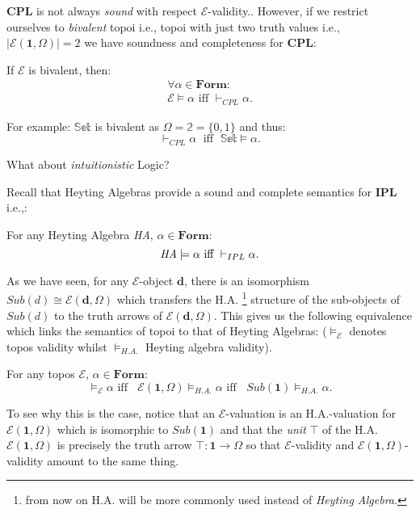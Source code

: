 \textbf{CPL} is not always \emph{sound} with respect $\mathcal{E}$-validity.. \newline
However, if we restrict ourselves to \emph{bivalent} topoi i.e., topoi with just two truth values i.e., $|\mathcal{E}(\textbf{1}, \Omega)|=2$ we have soundness and completeness for \textbf{CPL}:
\begin{prop}\label{bivalence}
	If $\mathcal{E}$ is bivalent, then:
	\begin{gather*}
		\forall \alpha \in \textbf{Form}:\\ 
		\mathcal{E} \models \alpha \text{ iff } \vdash_{CPL} \alpha.
	\end{gather*}
	
	For example:\newline
	$\mathbb{Set}$ is bivalent as $\Omega = \mathbb{2} = \{0,1\}$ and thus:
	\begin{equation*}
		\vdash_{CPL} \alpha \; \text{ iff } \; \mathbb{Set} \models \alpha.
	\end{equation*}
\end{prop}

What about \emph{intuitionistic} Logic? \newline

Recall that Heyting Algebras provide a sound and complete semantics for \textbf{IPL} i.e.,:

\begin{remark}
	For any Heyting Algebra \emph{HA}, $\alpha \in \mathbf{Form}$:
	\begin{equation*}
		\emph{HA} \models \alpha\text{ iff }\vdash_{IPL} \alpha.
	\end{equation*}
	 
\end{remark}

As we have seen, for any $\mathcal{E}$-object $\mathbf{d}$, there is an isomorphism $Sub(d) \cong \mathcal{E}(\textbf{d},\Omega)$ which transfers the H.A. \footnote{from now on H.A. will be more commonly used instead of \emph{Heyting Algebra}. } structure of the sub-objects of $Sub(d)$ to the truth arrows of $\mathcal{E}(\textbf{d},\Omega)$. \newline
 This gives us the following equivalence which links the semantics of topoi to that of Heyting Algebras:\newline
($\models_{\mathcal{E}}$ denotes topos validity whilst $\models_{H.A.}$ Heyting algebra validity).
\begin{prop}
	For any topos $\mathcal{E}$, $\alpha \in \mathbf{Form}$:
	\begin{equation*}
		\models_\mathcal{E} \alpha\text{ iff }\;\;\mathcal{E}(\textbf{1},\Omega) \models_{H.A.} \alpha\text{ iff }\;\;Sub(\textbf{1}) \models_{H.A.} \alpha.
	\end{equation*}
\end{prop}
To see why this is the case, notice that an $\mathcal{E}$-valuation is an H.A.-valuation for $\mathcal{E}(\textbf{1},\Omega)$ which is isomorphic to $Sub(\textbf{1})$ and that the \emph{unit} $\top$ of the H.A. $\mathcal{E}(\textbf{1},\Omega)$ is precisely the truth arrow $\top : \textbf{1}\rightarrow \Omega$ so that $\mathcal{E}$-validity and $\mathcal{E}(\textbf{1},\Omega)$-validity amount to the same thing. 


